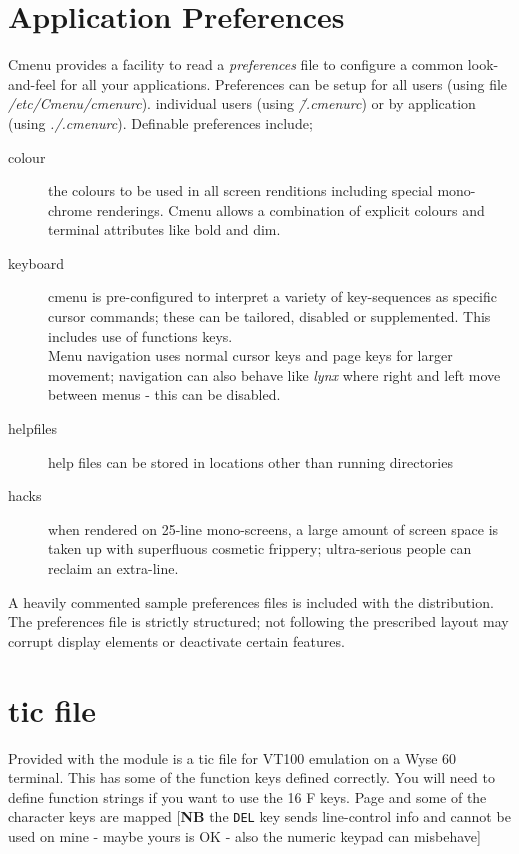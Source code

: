 \documentclass[a4paper]{scrartcl}
\begin{document}
\section{Application Preferences}
Cmenu provides a facility to read a \textit{preferences} file to configure a common look-and-feel for all your applications. Preferences can be setup for all users (using file \textit{/etc/Cmenu/cmenurc}). individual users (using \textit{\~/.cmenurc}) or by application (using \textit{./.cmenurc}). Definable preferences include;
\begin{description}
\item [colour] the colours to be used in all screen renditions including special mono-chrome renderings. Cmenu allows a combination of explicit colours and terminal attributes like bold and dim.
\item [keyboard] cmenu is pre-configured to interpret a variety of key-sequences as specific cursor commands; these can be tailored, disabled or supplemented. This includes use of functions keys.\\
Menu navigation uses normal cursor keys and page keys for larger movement; navigation can also behave like \textit{lynx} where right and left move between menus - this can be disabled.
\item [helpfiles] help files can be stored in locations other than running directories
\item [hacks] when rendered on 25-line mono-screens, a large amount of screen space is taken up with superfluous cosmetic frippery; ultra-serious people can reclaim an extra-line.
\end{description}
A heavily commented sample preferences files is included with the distribution. The preferences file is strictly structured; not following the prescribed layout may corrupt display elements or deactivate certain features.

\section{tic file}
Provided with the module is a tic file for VT100 emulation on a Wyse 60 terminal. This has some of the function keys defined correctly. You will need to define function strings if you want to use the 16 F keys. Page and some of the character keys are mapped [\textbf{NB} the \texttt{DEL} key sends line-control info and cannot be used on mine - maybe yours is OK - also the numeric keypad can misbehave]

\end{document}
